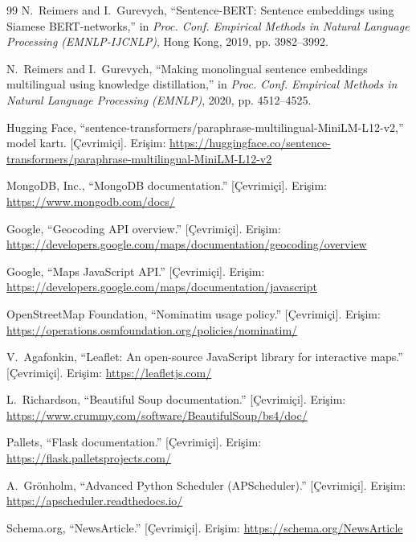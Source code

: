 \documentclass[conference,a4paper]{IEEEtran}
\begin{document}
\begin{thebibliography}{99}
N.~Reimers and I.~Gurevych, ``Sentence-BERT: Sentence embeddings using Siamese
BERT-networks,'' in \emph{Proc. Conf. Empirical Methods in Natural Language
Processing (EMNLP-IJCNLP)}, Hong Kong, 2019, pp. 3982--3992.

N.~Reimers and I.~Gurevych, ``Making monolingual sentence embeddings multilingual
using knowledge distillation,'' in \emph{Proc. Conf. Empirical Methods in Natural
Language Processing (EMNLP)}, 2020, pp. 4512--4525.

Hugging Face, ``sentence-transformers/paraphrase-multilingual-MiniLM-L12-v2,''
model kartı. [Çevrimiçi]. Erişim: \url{https://huggingface.co/sentence-transformers/paraphrase-multilingual-MiniLM-L12-v2}

MongoDB, Inc., ``MongoDB documentation.'' [Çevrimiçi]. Erişim:
\url{https://www.mongodb.com/docs/}

Google, ``Geocoding API overview.'' [Çevrimiçi]. Erişim:
\url{https://developers.google.com/maps/documentation/geocoding/overview}

Google, ``Maps JavaScript API.'' [Çevrimiçi]. Erişim:
\url{https://developers.google.com/maps/documentation/javascript}

OpenStreetMap Foundation, ``Nominatim usage policy.'' [Çevrimiçi]. Erişim:
\url{https://operations.osmfoundation.org/policies/nominatim/}

V.~Agafonkin, ``Leaflet: An open-source JavaScript library for interactive
maps.'' [Çevrimiçi]. Erişim: \url{https://leafletjs.com/}

L.~Richardson, ``Beautiful Soup documentation.'' [Çevrimiçi]. Erişim:
\url{https://www.crummy.com/software/BeautifulSoup/bs4/doc/}

Pallets, ``Flask documentation.'' [Çevrimiçi]. Erişim:
\url{https://flask.palletsprojects.com/}

A.~Grönholm, ``Advanced Python Scheduler (APScheduler).'' [Çevrimiçi]. Erişim:
\url{https://apscheduler.readthedocs.io/}

Schema.org, ``NewsArticle.'' [Çevrimiçi]. Erişim:
\url{https://schema.org/NewsArticle}
\end{thebibliography}
\end{document}
